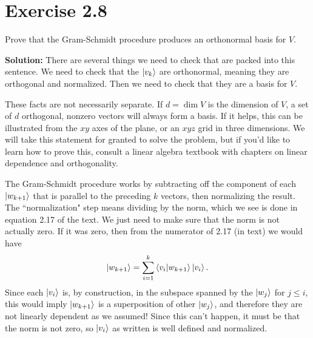 \documentclass{book}
\begin{document}
\section*{Exercise 2.8}
    Prove that the Gram-Schmidt procedure produces an orthonormal basis for $V$.
    
    \textbf{Solution:} There are several things we need to check that are packed into this sentence. We need to check that the $\ket{v_k}$ are orthonormal, meaning they are orthogonal and normalized. Then we need to check that they are a basis for $V$. 
    
    These facts are not necessarily separate. If $d=\dim{V}$ is the dimension of $V$, a set of $d$ orthogonal, nonzero vectors will always form a basis. If it helps, this can be illustrated from the $xy$ axes of the plane, or an $xyz$ grid in three dimensions. We will take this statement for granted to solve the problem, but if you'd like to learn how to prove this, consult a linear algebra textbook with chapters on linear dependence and orthogonality.
    
    The Gram-Schmidt procedure works by subtracting off the component of each $\ket{w_{k+1}}$ that is parallel to the preceding $k$ vectors, then normalizing the result. The ``normalization" step means dividing by the norm, which we see is done in equation 2.17 of the text. We just need to make sure that the norm is not actually zero. If it was zero, then from the numerator of 2.17 (in text) we would have
    \begin{align}
        \ket{w_{k+1}} = \sum_{i=1}^k \braket{v_i}{w_{k+1}} \ket{v_i}.
    \end{align}
    Since each $\ket{v_i}$ is, by construction, in the subspace spanned by the $\ket{w_j}$ for $j \leq i$, this would imply $\ket{w_{k+1}}$ is a superposition of other $\ket{w_j}$, and therefore they are not linearly dependent as we assumed! Since this can't happen, it must be that the norm is not zero, so $\ket{v_i}$ as written is well defined and normalized. 
    
\end{document}
